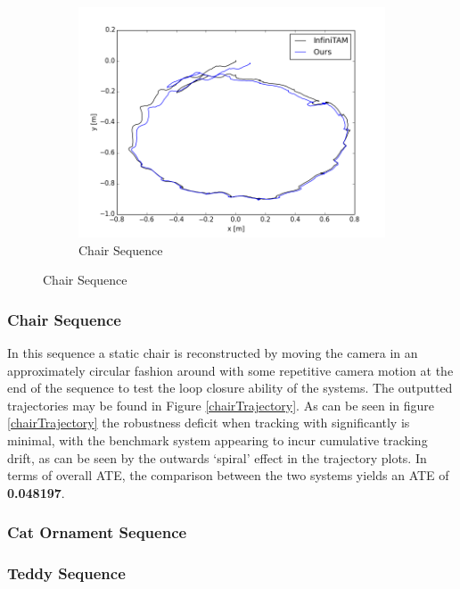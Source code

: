 \begin{figure}[!t]
\begin{subfigure}[b]{0.3\textwidth}
		\centering
		\includegraphics[scale=0.25]{plots/chairTrajectories.png}
		\caption{Chair Sequence}
		\label{chairTrajectory3}
	\end{subfigure}
\end{figure}

\subsubsection{Chair Sequence}
In this sequence a static chair is reconstructed by moving the camera in an approximately circular fashion around with some repetitive camera motion at the end of the sequence to test 
the loop closure ability of the systems. The outputted trajectories may be found in Figure \ref{chairTrajectory}.
As can be seen in figure \ref{chairTrajectory} the robustness deficit when tracking with significantly is minimal, with the benchmark system appearing to incur cumulative tracking drift, as can be seen 
by the outwards `spiral' effect in the trajectory plots. In terms of overall ATE, the comparison between the two systems yields an ATE of \textbf{0.048197}.

\subsubsection{Cat Ornament Sequence}
%

\subsubsection{Teddy Sequence}